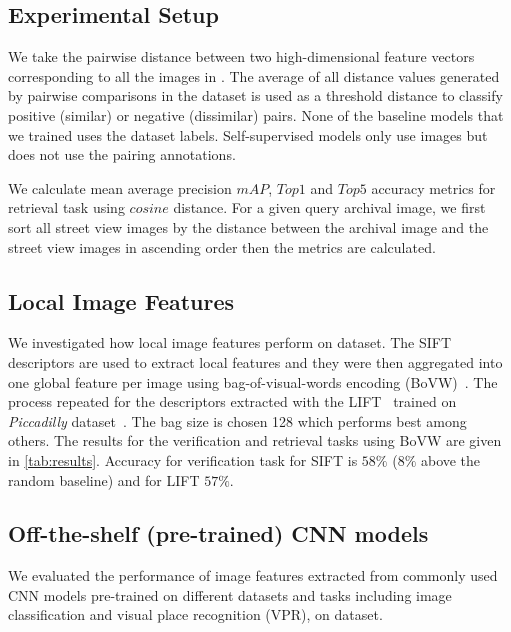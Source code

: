 \documentclass[a4paper,conference]{IEEEtran}
\begin{document}
\subsection{Experimental Setup}
\label{sub:setup}

We take the pairwise distance between two high-dimensional feature vectors corresponding to all the images in \amstertime. The average of all distance values generated by pairwise comparisons in the dataset is used as a threshold distance to classify positive (similar) or negative (dissimilar) pairs. None of the baseline models that we trained uses the dataset labels. Self-supervised models only use \amstertime images but does not use the pairing annotations.





We calculate mean average precision $mAP$, $Top1$ and $Top5$ accuracy metrics for retrieval task using $cosine$ distance. For a given query archival image, we first sort all street view images by the distance between the archival image and the street view images in ascending order then the metrics are calculated.


\subsection{Local Image Features}
\label{sub:local}
We investigated how local image features perform on \amstertime dataset. The SIFT~\cite{lowe2004distinctive} descriptors are used to extract local features and they were then aggregated into one global feature per image using bag-of-visual-words encoding (BoVW)~\cite{sivic2003bovw}. The process repeated for the descriptors extracted with the LIFT~\cite{yi2016lift} trained on \textit{Piccadilly} dataset~\cite{wilson2014piccadilly}. The bag size is chosen 128 which performs best among others. The results for the verification and retrieval tasks using BoVW are given in \cref{tab:results}. Accuracy for verification task for SIFT is $58\%$ ($8\%$ above the random baseline) and for LIFT $57\%$. 

\subsection{Off-the-shelf (pre-trained) CNN models}
\label{sub:cnn}
We evaluated the performance of image features extracted from commonly used CNN models pre-trained on different datasets and tasks including image classification and visual place recognition (VPR), on \amstertime dataset.
\end{document}
